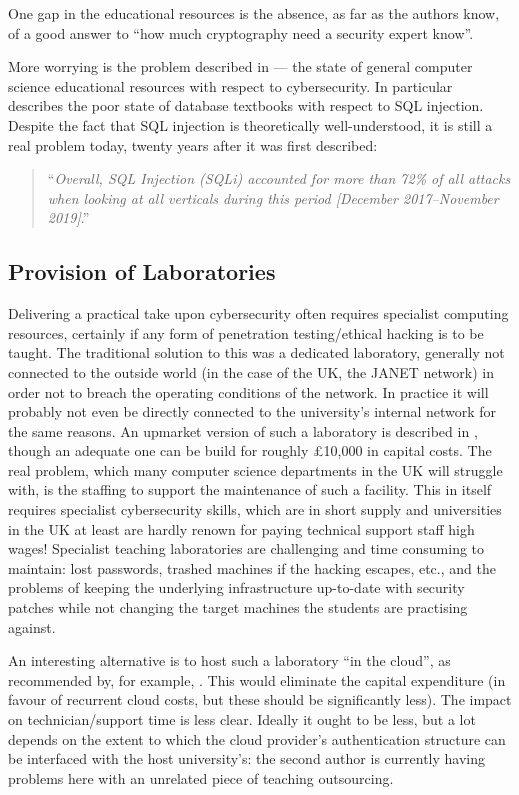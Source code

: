 \documentclass[conference]{IEEEtran}
\begin{document}
One gap in the educational resources is the absence, as far as the authors know, of a good answer to ``how much cryptography need a security expert know''. 

More worrying is the problem described in \cite[\S IV.B]{Cricketal2019} --- the state of general computer science educational resources with respect to cybersecurity. In particular \cite{Drop2019} describes the poor state of database textbooks with respect to SQL injection.  Despite the fact that SQL injection is theoretically well-understood, it is still a real problem today, twenty years after it was first described: 
\begin{quote}
``{\emph{Overall, SQL Injection (SQLi) accounted for more than 72\%
of all attacks when looking at all verticals during this
period [December 2017--November 2019]}}.'' \cite{Akamai2020a}
\end{quote}
\subsection{Provision of Laboratories}
Delivering a practical take upon cybersecurity often requires specialist computing resources, certainly if any form of penetration testing/ethical hacking is to be taught. The traditional solution to this was a dedicated laboratory, generally not connected to the outside world (in the case of the UK, the JANET network)  in order not to breach the operating conditions of the network. In practice it will probably not even be directly connected to the university's internal network for the same reasons.  An upmarket version of such a laboratory is described in \cite{Abler2006}, though an adequate one can be build for roughly \pounds10,000 in capital costs.  The real problem, which many computer science departments in the UK will struggle with, is the staffing to support the maintenance of such a facility. This in itself requires specialist cybersecurity skills, which are in short supply and universities in the UK at least are hardly renown for paying technical support staff high wages! Specialist teaching laboratories are challenging and time consuming to maintain: lost passwords, trashed machines if the hacking escapes, etc., and the problems of keeping the underlying infrastructure up-to-date with security patches while not changing the target machines the students are practising against.

An interesting alternative is to host such a laboratory ``in the cloud'', as recommended by, for example, \cite{Salah2014a}. This would eliminate the capital expenditure (in favour of recurrent cloud costs, but these should be significantly less). The impact on technician/support time is less clear. Ideally it ought to be less, but a lot depends on the extent to which the cloud provider's authentication structure can be interfaced with the host university's: the second author is currently having problems here with an unrelated piece of teaching outsourcing.
\end{document}
